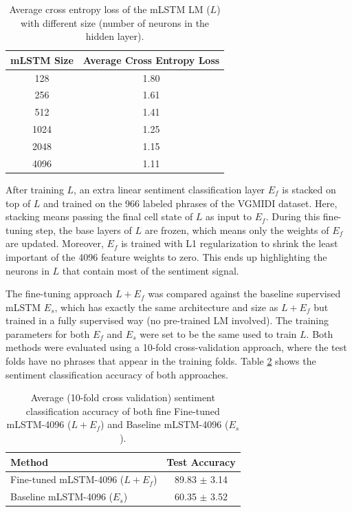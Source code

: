 \begin{table}[!h]
 \begin{center}
 \begin{tabular}{cc}
  \hline
  \textbf{mLSTM Size} & \textbf{Average Cross Entropy Loss}\\ \hline
  128 & 1.80   \\
  256  & 1.61  \\
  512  & 1.41  \\
  1024 & 1.25  \\
  2048 & 1.15  \\
  4096 & 1.11  \\ \hline
 \end{tabular}
\end{center}
\caption{Average cross entropy loss of the mLSTM LM ($L$) with different size (number of neurons in the hidden layer).}
 \label{tab:gen_anal}
\end{table}

After training $L$, an extra linear sentiment classification layer $E_f$ is stacked on top of $L$ and trained on the 966 labeled phrases of the VGMIDI dataset. Here, stacking means passing the final cell state of $L$ as input to $E_f$. During this fine-tuning step, the base layers of $L$ are frozen, which means only the weights of $E_f$ are updated. Moreover, $E_f$ is trained with L1 regularization to shrink the least important of the 4096 feature weights to zero. This ends up highlighting the neurons in $L$ that contain most of the sentiment signal.

The fine-tuning approach $L + E_f$ was compared against the baseline supervised mLSTM $E_s$, which has exactly the same architecture and size as $L + E_f$ but trained in a fully supervised way (no pre-trained LM involved).
The training parameters for both $E_f$ and $E_s$ were set to be the same used to train $L$. Both methods were evaluated using a 10-fold cross-validation approach, where the test folds have no phrases that appear in the training folds. Table \ref{tab:sent_anal} shows the sentiment classification accuracy of both approaches.

\begin{table}[!h]
 \begin{center}
 \begin{tabular}{lc}
  \hline
  \textbf{Method} & \textbf{Test Accuracy} \\ \hline
  Fine-tuned mLSTM-4096 ($L + E_f$) & 89.83 $\pm$ 3.14\\
  Baseline mLSTM-4096 ($E_s$) & 60.35 $\pm$ 3.52 \\
  \hline
 \end{tabular}
\end{center}
\caption{Average (10-fold cross validation) sentiment classification accuracy of both fine Fine-tuned mLSTM-4096 ($L + E_f$) and Baseline mLSTM-4096 ($E_s$).}
 \label{tab:sent_anal}
\end{table}


